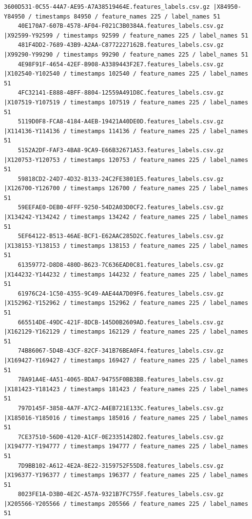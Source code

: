 \documentclass{UoNMCHA}
\numberwithin{equation}{section}
\begin{document}
\begin{lstlisting}[breaklines=true]
    3600D531-0C55-44A7-AE95-A7A38519464E.features_labels.csv.gz |X84950-Y84950 / timestamps 84950 / feature_names 225 / label_names 51
    40E170A7-607B-4578-AF04-F021C3B0384A.features_labels.csv.gz |X92599-Y92599 / timestamps 92599 / feature_names 225 / label_names 51
    481F4DD2-7689-43B9-A2AA-C8772227162B.features_labels.csv.gz |X99290-Y99290 / timestamps 99290 / feature_names 225 / label_names 51
    4E98F91F-4654-42EF-B908-A3389443F2E7.features_labels.csv.gz |X102540-Y102540 / timestamps 102540 / feature_names 225 / label_names 51
    4FC32141-E888-4BFF-8804-12559A491D8C.features_labels.csv.gz |X107519-Y107519 / timestamps 107519 / feature_names 225 / label_names 51
    5119D0F8-FCA8-4184-A4EB-19421A40DE0D.features_labels.csv.gz |X114136-Y114136 / timestamps 114136 / feature_names 225 / label_names 51
    5152A2DF-FAF3-4BA8-9CA9-E66B32671A53.features_labels.csv.gz |X120753-Y120753 / timestamps 120753 / feature_names 225 / label_names 51
    59818CD2-24D7-4D32-B133-24C2FE3801E5.features_labels.csv.gz |X126700-Y126700 / timestamps 126700 / feature_names 225 / label_names 51
    59EEFAE0-DEB0-4FFF-9250-54D2A03D0CF2.features_labels.csv.gz |X134242-Y134242 / timestamps 134242 / feature_names 225 / label_names 51
    5EF64122-B513-46AE-BCF1-E62AAC285D2C.features_labels.csv.gz |X138153-Y138153 / timestamps 138153 / feature_names 225 / label_names 51
    61359772-D8D8-480D-B623-7C636EAD0C81.features_labels.csv.gz |X144232-Y144232 / timestamps 144232 / feature_names 225 / label_names 51
    61976C24-1C50-4355-9C49-AAE44A7D09F6.features_labels.csv.gz |X152962-Y152962 / timestamps 152962 / feature_names 225 / label_names 51
    665514DE-49DC-421F-8DCB-145D0B2609AD.features_labels.csv.gz |X162129-Y162129 / timestamps 162129 / feature_names 225 / label_names 51
    74B86067-5D4B-43CF-82CF-341B76BEA0F4.features_labels.csv.gz |X169427-Y169427 / timestamps 169427 / feature_names 225 / label_names 51
    78A91A4E-4A51-4065-BDA7-94755F0BB3BB.features_labels.csv.gz |X181423-Y181423 / timestamps 181423 / feature_names 225 / label_names 51
    797D145F-3858-4A7F-A7C2-A4EB721E133C.features_labels.csv.gz |X185016-Y185016 / timestamps 185016 / feature_names 225 / label_names 51
    7CE37510-56D0-4120-A1CF-0E23351428D2.features_labels.csv.gz |X194777-Y194777 / timestamps 194777 / feature_names 225 / label_names 51
    7D9BB102-A612-4E2A-8E22-3159752F55D8.features_labels.csv.gz |X196377-Y196377 / timestamps 196377 / feature_names 225 / label_names 51
    8023FE1A-D3B0-4E2C-A57A-9321B7FC755F.features_labels.csv.gz |X205566-Y205566 / timestamps 205566 / feature_names 225 / label_names 51

\end{lstlisting}
\end{document}
